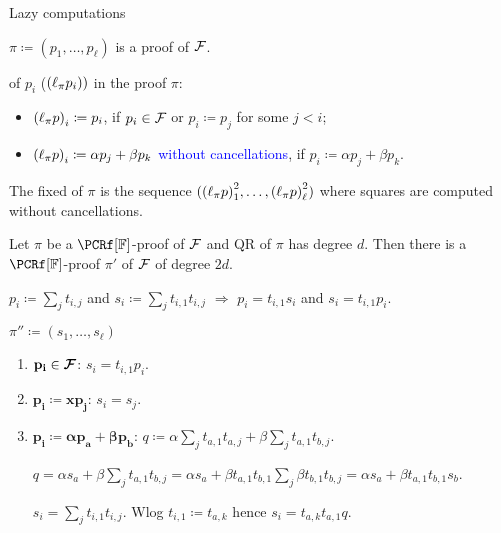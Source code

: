 \begin{frame}{Lazy computations}
    
    $\pi \coloneqq (p_1, \dots, p_{\ell})$ is a proof of $\mathcal{F}$.

    \pause
     of $p_i$ (${(\ell_{\pi}{p_i})})$ in the proof $\pi$:
    \begin{itemize}
        \item ${(\ell_{\pi}{p})}_i \coloneqq p_i$, if $p_i \in \mathcal{F}$ or $p_i \coloneqq p_j$ for some $j < i$;
        \item ${(\ell_{\pi}{p})}_i \coloneqq \alpha p_j + \beta p_k$ \textcolor{blue}{without cancellations}, if
            $p_i \coloneqq \alpha p_j + \beta p_k$.
    \end{itemize}

    \pause
    The fixed  of $\pi$ is the sequence $({(\ell_{\pi}{p})}_1^2, \dots, {(\ell_{\pi}{p})}_{\ell}^2)$ where
    squares are computed without cancellations.

    \pause
    \begin{lemma}
        Let $\pi$ be a $\PCRf[\field]$-proof of $\mathcal{F}$ and QR of $\pi$ has degree $d$. Then there is a
        $\PCRf[\field]$-proof $\pi'$ of $\mathcal{F}$ of degree $2d$.
    \end{lemma}

    \pause
    $p_i \coloneqq \sum\limits_{j} t_{i, j}$ and $s_i \coloneqq \sum\limits_{j} t_{i, 1} t_{i, j}$
    \hspace{0.4cm} $\Rightarrow$ \hspace{0.4cm} $p_i = t_{i, 1} s_i$ and $s_i = t_{i, 1} p_i$.

    \pause
    $\pi'' \coloneqq (s_1, \dots, s_{\ell})$
    \pause
    
    \begin{enumerate}
        \item $\mathbf{p_i \in \boldsymbol{\mathcal{F}}}$: \hspace{0.3cm} $s_i = t_{i, 1} p_i$.
        \item $\mathbf{p_i \coloneqq x p_j}$: \hspace{0.3cm} $s_i = s_j$.
        \item $\mathbf{p_i \coloneqq \boldsymbol{\alpha} p_a + \boldsymbol{\beta} p_b}$: \hspace{0.3cm}
            \pause $q \coloneqq \alpha \sum\limits_{j} t_{a, 1} t_{a, j} + \beta \sum\limits_{j} t_{a, 1}
            t_{b, j}$.

            \pause
            $q = \alpha s_{a} +  \beta \sum\limits_{j} t_{a, 1} t_{b, j} = \alpha s_a + \beta t_{a, 1}
            t_{b, 1} \sum\limits_{j} \beta t_{b, 1} t_{b, j} = \alpha s_a + \beta t_{a, 1} t_{b, 1} s_b$.

            \pause
            $s_i = \sum\limits_{j} t_{i, 1} t_{i, j}$. Wlog $t_{i, 1} \coloneqq t_{a, k}$ hence $s_i = t_{a, k} t_{a, 1} q$.
    \end{enumerate}


\end{frame}



